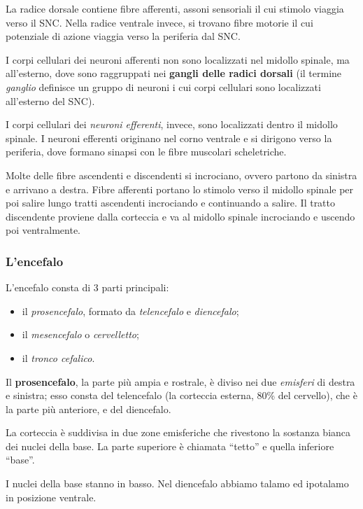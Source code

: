 \documentclass[]{article}
\begin{document}
La radice dorsale contiene fibre afferenti, assoni sensoriali il cui
stimolo viaggia verso il SNC. Nella radice ventrale invece, si trovano
fibre motorie il cui potenziale di azione viaggia verso la periferia dal
SNC.

I corpi cellulari dei neuroni afferenti non sono localizzati nel midollo
spinale, ma all'esterno, dove sono raggruppati nei \textbf{gangli delle
radici dorsali} (il termine \emph{ganglio} definisce un gruppo di
neuroni i cui corpi cellulari sono localizzati all'esterno del SNC).

I corpi cellulari dei \emph{neuroni efferenti}, invece, sono localizzati
dentro il midollo spinale. I neuroni efferenti originano nel corno
ventrale e si dirigono verso la periferia, dove formano sinapsi con le
fibre muscolari scheletriche.

Molte delle fibre ascendenti e discendenti si incrociano, ovvero partono
da sinistra e arrivano a destra. Fibre afferenti portano lo stimolo
verso il midollo spinale per poi salire lungo tratti ascendenti
incrociando e continuando a salire. Il tratto discendente proviene dalla
corteccia e va al midollo spinale incrociando e uscendo poi
ventralmente.

\subsubsection{L'encefalo}\label{lencefalo}

L'encefalo consta di 3 parti principali:

\begin{itemize}
\itemsep1pt\parskip0pt
\item
  il \emph{prosencefalo}, formato da \emph{telencefalo} e
  \emph{diencefalo};
\item
  il \emph{mesencefalo} o \emph{cervelletto};
\item
  il \emph{tronco cefalico}.
\end{itemize}

Il \textbf{prosencefalo}, la parte più ampia e rostrale, è diviso nei
due \emph{emisferi} di destra e sinistra; esso consta del telencefalo
(la corteccia esterna, 80\% del cervello), che è la parte più anteriore,
e del diencefalo.

La corteccia è suddivisa in due zone emisferiche che rivestono la
sostanza bianca dei nuclei della base. La parte superiore è chiamata
``tetto'' e quella inferiore ``base''.

I nuclei della base stanno in basso. Nel diencefalo abbiamo talamo ed
ipotalamo in posizione ventrale.
\end{document}
